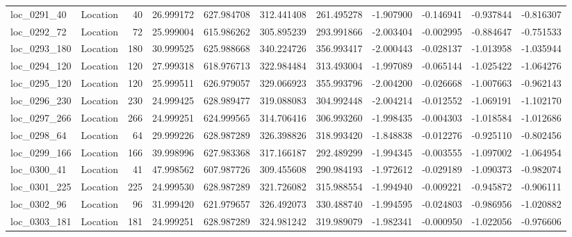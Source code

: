 \begin{tabular}{llrrrrrrrrr}
  loc_0291_40 &        Location &              40 &  26.999172 & 627.984708 &  312.441408 &    261.495278 &  -1.907900 &  -0.146941 &   -0.937844 &     -0.816307 \\
  loc_0292_72 &        Location &              72 &  25.999004 & 615.986262 &  305.895239 &    293.991866 &  -2.003404 &  -0.002995 &   -0.884647 &     -0.751533 \\
 loc_0293_180 &        Location &             180 &  30.999525 & 625.988668 &  340.224726 &    356.993417 &  -2.000443 &  -0.028137 &   -1.013958 &     -1.035944 \\
 loc_0294_120 &        Location &             120 &  27.999318 & 618.976713 &  322.984484 &    313.493004 &  -1.997089 &  -0.065144 &   -1.025422 &     -1.064276 \\
 loc_0295_120 &        Location &             120 &  25.999511 & 626.979057 &  329.066923 &    355.993796 &  -2.004200 &  -0.026668 &   -1.007663 &     -0.962143 \\
 loc_0296_230 &        Location &             230 &  24.999425 & 628.989477 &  319.088083 &    304.992448 &  -2.004214 &  -0.012552 &   -1.069191 &     -1.102170 \\
 loc_0297_266 &        Location &             266 &  24.999251 & 624.999565 &  314.706416 &    306.993260 &  -1.998435 &  -0.004303 &   -1.018584 &     -1.012686 \\
  loc_0298_64 &        Location &              64 &  29.999226 & 628.987289 &  326.398826 &    318.993420 &  -1.848838 &  -0.012276 &   -0.925110 &     -0.802456 \\
 loc_0299_166 &        Location &             166 &  39.998996 & 627.983368 &  317.166187 &    292.489299 &  -1.994345 &  -0.003555 &   -1.097002 &     -1.064954 \\
  loc_0300_41 &        Location &              41 &  47.998562 & 607.987726 &  309.455608 &    290.984193 &  -1.972612 &  -0.029189 &   -1.090373 &     -0.982074 \\
 loc_0301_225 &        Location &             225 &  24.999530 & 628.987289 &  321.726082 &    315.988554 &  -1.994940 &  -0.009221 &   -0.945872 &     -0.906111 \\
  loc_0302_96 &        Location &              96 &  31.999420 & 621.979657 &  326.492073 &    330.488740 &  -1.994595 &  -0.024803 &   -0.986956 &     -1.020882 \\
 loc_0303_181 &        Location &             181 &  24.999251 & 628.987289 &  324.981242 &    319.989079 &  -1.982341 &  -0.000950 &   -1.022056 &     -0.976606 \\

\end{tabular}
